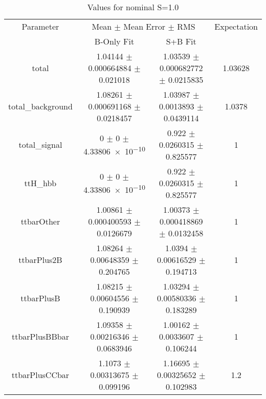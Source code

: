 \begin{table}
\centering
\caption{Values for nominal S=1.0}
\begin{tabular}{cccc}
\toprule
Parameter & \multicolumn{2}{c}{Mean $\pm$ Mean Error $\pm$ RMS} & Expectation\\
 & B-Only Fit & S+B Fit & \\
\midrule
total & \num{1.04144} $\pm$ \num{0.000664884} $\pm$ \num{0.021018} & \num{1.03539} $\pm$ \num{0.000682772} $\pm$ \num{0.0215835} & \num{1.03628}\\
total\_background & \num{1.08261} $\pm$ \num{0.000691168} $\pm$ \num{0.0218457} & \num{1.03987} $\pm$ \num{0.0013893} $\pm$ \num{0.0439114} & \num{1.0378}\\
total\_signal & \num{0} $\pm$ \num{0} $\pm$ \num{4.33806e-10} & \num{0.922} $\pm$ \num{0.0260315} $\pm$ \num{0.825577} & \num{1}\\
ttH\_hbb & \num{0} $\pm$ \num{0} $\pm$ \num{4.33806e-10} & \num{0.922} $\pm$ \num{0.0260315} $\pm$ \num{0.825577} & \num{1}\\
ttbarOther & \num{1.00861} $\pm$ \num{0.000400593} $\pm$ \num{0.0126679} & \num{1.00373} $\pm$ \num{0.000418869} $\pm$ \num{0.0132458} & \num{1}\\
ttbarPlus2B & \num{1.08264} $\pm$ \num{0.00648359} $\pm$ \num{0.204765} & \num{1.0394} $\pm$ \num{0.00616529} $\pm$ \num{0.194713} & \num{1}\\
ttbarPlusB & \num{1.08215} $\pm$ \num{0.00604556} $\pm$ \num{0.190939} & \num{1.03294} $\pm$ \num{0.00580336} $\pm$ \num{0.183289} & \num{1}\\
ttbarPlusBBbar & \num{1.09358} $\pm$ \num{0.00216346} $\pm$ \num{0.0683946} & \num{1.00162} $\pm$ \num{0.0033607} $\pm$ \num{0.106244} & \num{1}\\
ttbarPlusCCbar & \num{1.1073} $\pm$ \num{0.00313675} $\pm$ \num{0.099196} & \num{1.16695} $\pm$ \num{0.00325652} $\pm$ \num{0.102983} & \num{1.2}\\
\bottomrule
\end{tabular}
\end{table}